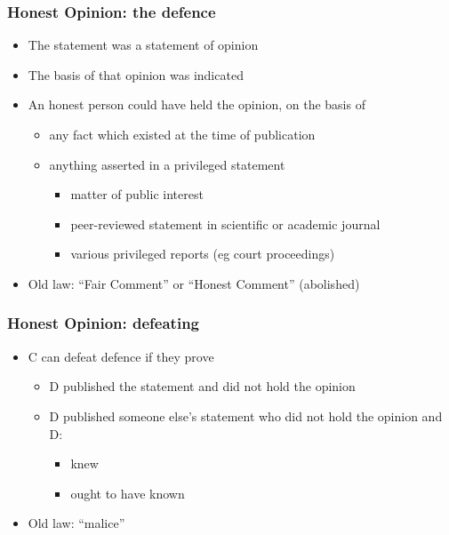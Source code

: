 \documentclass[ignorenonframetext,]{beamer}
\begin{document}
\begin{frame}
\frametitle{Honest Opinion: the defence}

\begin{itemize}
\item The statement was a statement of opinion 
\item The basis of that opinion was indicated
\item An honest person could have held the opinion, on the basis of
  \begin{itemize}
  \item any fact which existed at the time of publication
  \item anything asserted in a privileged statement
    \begin{itemize}
    \item matter of public interest
    \item peer-reviewed statement in scientific or academic journal
    \item various privileged reports (eg court proceedings)
    \end{itemize}
  \end{itemize}
\item Old law: ``Fair Comment'' or ``Honest Comment'' (abolished)
\end{itemize}
\end{frame}


\begin{frame}
  \frametitle{Honest Opinion: defeating}
  \begin{itemize}
  \item C can defeat defence if they prove
    \begin{itemize}
    \item D published the statement and did not hold the opinion
    \item D published someone else's statement who did not hold the opinion and D:
      \begin{itemize}
      \item knew
      \item ought to have known
      \end{itemize}
    \end{itemize}
  \item Old law: ``malice''
  \end{itemize}

\end{frame}
\end{document}
